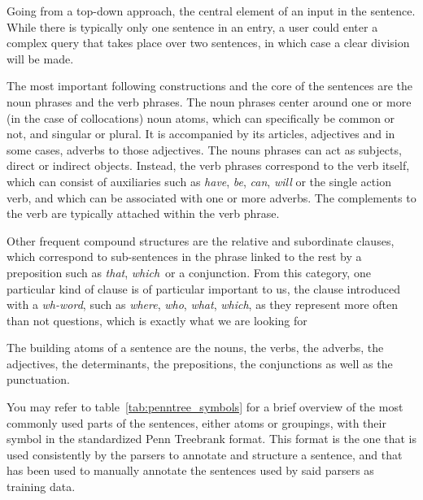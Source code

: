 Going from a top-down approach, the central element of an input in the sentence. While there is typically only one sentence in an entry, a user could enter a complex query that takes place over two sentences, in which case a clear division will be made.

The most important following constructions and the core of the sentences are the noun phrases and the verb phrases. The noun phrases center around one or more (in the case of collocations) noun atoms, which can specifically be common or not, and singular or plural. It is accompanied by its articles, adjectives and in some cases, adverbs to those adjectives. The nouns phrases can act as subjects, direct or indirect objects. Instead, the verb phrases correspond to the verb itself, which can consist of auxiliaries such as \emph{have}, \emph{be}, \emph{can}, \emph{will} or the single action verb, and which can be associated with one or more adverbs. The complements to the verb are typically attached within the verb phrase.

Other frequent compound structures are the relative and subordinate clauses, which correspond to sub-sentences in the phrase linked to the rest by a preposition such as \emph{that}, \emph{which}\ or a conjunction. From this category, one particular kind of clause is of particular important to us, the clause introduced with a \emph{wh-word}, such as \emph{where}, \emph{who}, \emph{what}, \emph{which}, as they represent more often than not questions, which is exactly what we are looking for

The building atoms of a sentence are the nouns, the verbs, the adverbs, the adjectives, the determinants, the prepositions, the conjunctions as well as the punctuation.

You may refer to table~\ref{tab:penntree_symbols} for a brief overview of the most commonly used parts of the sentences, either atoms or groupings, with their symbol in the standardized Penn Treebrank format. This format is the one that is used consistently by the parsers to annotate and structure a sentence, and that has been used to manually annotate the sentences used by said parsers as training data.

